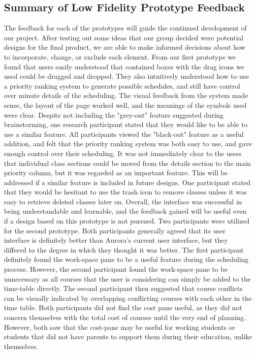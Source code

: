 \documentclass{article}
\begin{document}
\subsection{Summary of Low Fidelity Prototype Feedback}
The feedback for each of the prototypes will guide the continued development of our project. After testing out some ideas that our group decided were potential designs for the final product, we are able to make informed decisions about how to incorporate, change, or exclude each element.
\newline
\newline
From our first prototype we found that users easily understood that contained boxes with the drag icons we used could be dragged and dropped. They also intuitively understood how to use a priority ranking system to generate possible schedules, and still have control over minute details of the scheduling. The visual feedback from the system made sense, the layout of the page worked well, and the meanings of the symbols used were clear. Despite not including the "grey-out" feature suggested during brainstorming, one research participant stated that they would like to be able to use a similar feature. All participants viewed the "black-out" feature as a useful addition, and felt that the priority ranking system was both easy to use, and gave enough control over their scheduling. It was not immediately clear to the users that individual class sections could be moved from the details section to the main priority column, but it was regarded as an important feature. This will be addressed if a similar feature is included in future designs. One participant stated that they would be hesitant to use the trash icon to remove classes unless it was easy to retrieve deleted classes later on. Overall, the interface was successful in being understandable and learnable, and the feedback gained will be useful even if a design based on this prototype is not pursued.
\newline
\newline
Two participants were utilized for the second prototype. Both participants generally agreed that its user interface is definitely better than Aurora's current user interface, but they differed to the degree in which they thought it was better. The first participant definitely found the work-space pane to be a useful feature during the scheduling process. However, the second participant found the work-space pane to be unnecessary as all courses that the user is considering can simply be added to the time-table directly. The second participant then suggested that course conflicts can be visually indicated by overlapping conflicting courses with each other in the time table. Both participants did not find the cost pane useful, as they did not concern themselves with the total cost of courses until the very end of planning. However, both saw that the cost-pane may be useful for working students or students that did not have parents to support them during their education, unlike themselves.
\end{document}
